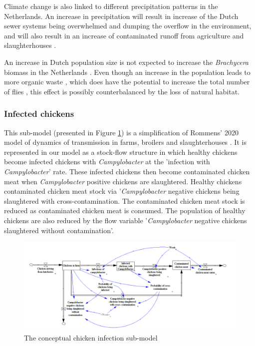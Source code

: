 Climate change is also linked to different precipitation patterns in the Netherlands. An increase in precipitation will result in increase of the Dutch sewer systems being overwhelmed and dumping the overflow in the environment, and will also result in an increase of contaminated runoff from agriculture and slaughterhouses \parencite{kwaad_summer_1991}.

An increase in Dutch population size is not expected to increase the \textit{Brachycera} biomass in the Netherlands \parencite{guenat_effects_2019}. Even though an increase in the population leads to more organic waste \parencite{garcia-garcia_framework_2015}, which does have the potential to increase the total number of flies \parencite{imai_population_1984, rozendaal_houseflies_1997}, this effect is possibly counterbalanced by the loss of natural habitat.




\subsubsection*{Infected chickens}
This sub-model (presented in Figure \ref{fig:transmission_submodel}) is a simplification of Rommens' 2020 model of dynamics of transmission in farms, broilers and slaughterhouses \parencite{rommens_infected_2020}. It is represented in our model as a stock-flow structure in which healthy chickens become infected chickens with \textit{Campylobacter} at the 'infection with \textit{Campylobacter}' rate. These infected chickens then become contaminated chicken meat when \textit{Campylobacter} positive chickens are slaughtered. Healthy chickens  contaminated chicken meat stock via '\textit{Campylobacter} negative chickens being slaughtered with cross-contamination. The contaminated chicken meat stock is reduced as contaminated chicken meat is consumed. The population of healthy chickens are also reduced by the flow variable '\textit{Campylobacter} negative chickens slaughtered without contamination'.

\begin{figure}[h]
\centering
\includegraphics[width=1\textwidth]{images/Transmission submodel.png}
\caption{The conceptual chicken infection sub-model}
\label{fig:transmission_submodel}
\end{figure}

